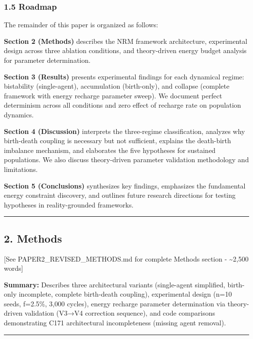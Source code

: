 \documentclass[
]{article}
\begin{document}
\subsubsection{1.5 Roadmap}\label{roadmap}

The remainder of this paper is organized as follows:

\textbf{Section 2 (Methods)} describes the NRM framework architecture,
experimental design across three ablation conditions, and theory-driven
energy budget analysis for parameter determination.

\textbf{Section 3 (Results)} presents experimental findings for each
dynamical regime: bistability (single-agent), accumulation (birth-only),
and collapse (complete framework with energy recharge parameter sweep).
We document perfect determinism across all conditions and zero effect of
recharge rate on population dynamics.

\textbf{Section 4 (Discussion)} interprets the three-regime
classification, analyzes why birth-death coupling is necessary but not
sufficient, explains the death-birth imbalance mechanism, and elaborates
the five hypotheses for sustained populations. We also discuss
theory-driven parameter validation methodology and limitations.

\textbf{Section 5 (Conclusions)} synthesizes key findings, emphasizes
the fundamental energy constraint discovery, and outlines future
research directions for testing hypotheses in reality-grounded
frameworks.

\begin{center}\rule{0.5\linewidth}{0.5pt}\end{center}

\subsection{2. Methods}\label{methods}

{[}See PAPER2\_REVISED\_METHODS.md for complete Methods section -
\textasciitilde2,500 words{]}

\textbf{Summary:} Describes three architectural variants (single-agent
simplified, birth-only incomplete, complete birth-death coupling),
experimental design (n=10 seeds, f=2.5\%, 3,000 cycles), energy recharge
parameter determination via theory-driven validation (V3→V4 correction
sequence), and code comparisons demonstrating C171 architectural
incompleteness (missing agent removal).

\begin{center}\rule{0.5\linewidth}{0.5pt}\end{center}
\end{document}
